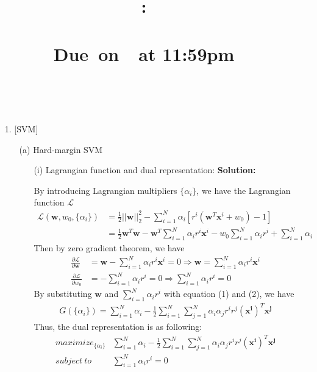 \documentclass{article}
\title{
    \vspace{2in}
    \textmd{\textbf{\hmwkClass:\\ \hmwkTitle}}\\
    \normalsize\vspace{0.1in}\small{Due\ on\ \hmwkDueDate\ at 11:59pm}\\
    \vspace{0.1in}\large{\textit{\hmwkClassInstructor}}
    \vspace{3in}
}
\author{\textbf{\hmwkAuthorName}\\ \hmwkAuthorID}
\date{}
\renewcommand{\b}[1]{\bm{#1}}
\begin{document}
\maketitle
\pagebreak

\begin{enumerate}
    \setlength\parindent{2em}
    \item [1.] [SVM]
    \begin{enumerate}
        \item [(a)] Hard-margin SVM
        \begin{enumerate}
            \setlength\parindent{2em}
            \item [(i)] Lagrangian function and dual representation:\newline
            {\bf Solution:}
            \par By introducing Lagrangian multipliers $\{\alpha_i\}$, we have the Lagrangian function $\mathcal{L}$
            \begin{align*}
                \mathcal{L}(\b{w},w_0,\{\alpha_i\}) &= \frac{1}{2}||\b{w}||_2^2 - \sum_{i=1}^N\alpha_i\left[r^i(\b{w}^T\b{x}^i+w_0)-1\right]\\
                &= \frac{1}{2} \b{w}^T\b{w} - \b{w}^T\sum_{i=1}^N\alpha_i r^i\b{x}^i-w_0\sum_{i=1}^N\alpha_ir^i+\sum_{i=1}^N\alpha_i
            \end{align*}
            Then by zero gradient theorem, we have 
            \begin{align}
                \frac{\partial \mathcal{L}}{\partial \b{w}} &=\b{w}-\sum_{i=1}^N\alpha_ir^i\b{x}^i=0 \Rightarrow\b{w}=\sum_{i=1}^N\alpha_ir^i\b{x}^i\\
                \frac{\partial \mathcal{L}}{\partial w_0} &=-\sum_{i=1}^N\alpha_ir^i=0 \Rightarrow \sum_{i=1}^N\alpha_ir^i=0
            \end{align}
            By substituting $\b{w}$ and $\sum_{i=1}^N\alpha_ir^i$ with equation (1) and (2), we have 
            \begin{align*}
                G(\{\alpha_i\})=\sum_{i=1}^N\alpha_i-\frac{1}{2}\sum_{i=1}^N\sum_{j=1}^N\alpha_i\alpha_jr^ir^j(\b{x^i})^T\b{x^j}
            \end{align*}
            Thus, the dual representation is as following:
            \begin{align*}
                {maximize}_{\{\alpha_i\}} &\sum_{i=1}^N\alpha_i-\frac{1}{2}\sum_{i=1}^N\sum_{j=1}^N\alpha_i\alpha_jr^ir^j(\b{x^i})^T\b{x^j}\\
                subject\ to\ &\sum_{i=1}^N\alpha_ir^i=0\\

\end{align*}
\end{enumerate}
\end{enumerate}
\end{enumerate}
\end{document}
